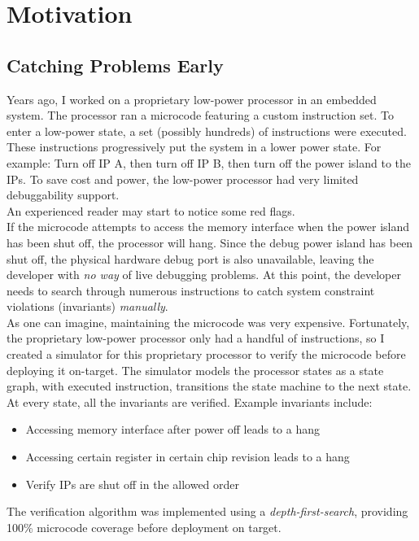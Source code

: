 \chapter{Motivation}

\section{Catching Problems Early} 

Years ago, I worked on a proprietary low-power processor in an embedded
system. The processor ran a microcode featuring a custom instruction set. To
enter a low-power state, a set (possibly hundreds) of instructions were
executed. These instructions progressively put the system in a lower power state.
For example: Turn off IP A, then turn off IP B, then turn off the power island
to the IPs. To save cost and power, the low-power processor had very limited
debuggability support.\\

An experienced reader may start to notice some red flags.\\

If the microcode attempts to access the memory interface when the power
island has been shut off, the processor will hang. Since the debug power island has
been shut off, the physical hardware debug port is also unavailable, leaving the
developer with \textit{no way} of live debugging problems. At this point,
the developer needs to search through numerous instructions to
catch system constraint violations (invariants) \textit{manually}.\\

As one can imagine, maintaining the microcode was very expensive.
Fortunately, the proprietary low-power processor only had a handful of
instructions, so I created a simulator for this proprietary processor to verify
the microcode before deploying it on-target. The simulator models the processor
states as a state graph, with executed instruction, transitions the state machine
to the next state. At every state, all the invariants are verified. Example
invariants include:
\begin{itemize} 
    \item Accessing memory interface after power off leads to a hang 
    \item Accessing certain register in certain chip revision leads to a hang 
    \item Verify IPs are shut off in the allowed order
\end{itemize}
The verification algorithm was implemented using a \textit{depth-first-search},
providing 100\% microcode coverage before deployment on target.\\


